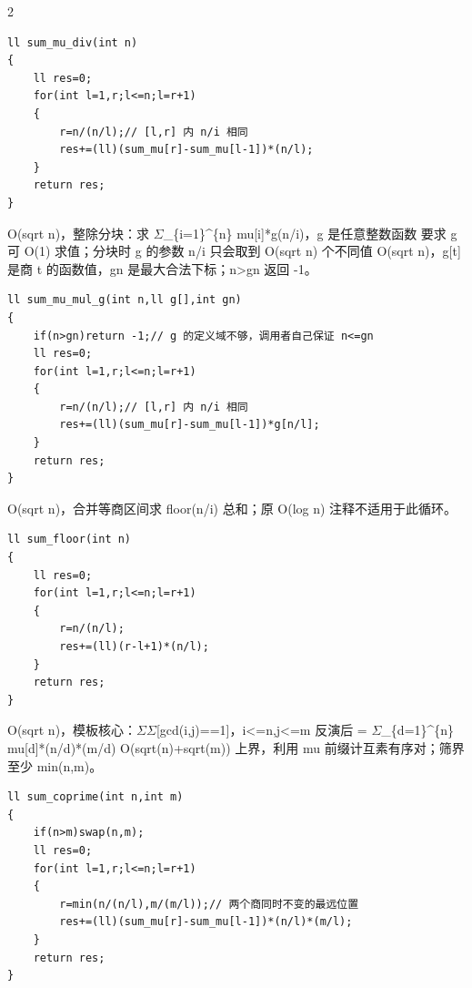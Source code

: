 \documentclass[UTF8,fontset=fandol,a4paper,twoside]{ctexart}
\newcommand{\note}[1]{{\fontsize{10}{12}\selectfont #1\par}}
\begin{document}
\begin{multicols}{2}
\begin{lstlisting}
ll sum_mu_div(int n)
{
    ll res=0;
    for(int l=1,r;l<=n;l=r+1)
    {
        r=n/(n/l);// [l,r] 内 n/i 相同
        res+=(ll)(sum_mu[r]-sum_mu[l-1])*(n/l);
    }
    return res;
}
\end{lstlisting}
\note{O(\allowbreak{}sqrt n)\allowbreak{}，整除分块：求 \ensuremath{\Sigma}\_\{i=\allowbreak{}1\}\textasciicircum{}\{n\} mu[\allowbreak{}i]\allowbreak{}*g(\allowbreak{}n/\allowbreak{}i)\allowbreak{}，g 是任意整数函数 要求 g 可 O(\allowbreak{}1)\allowbreak{} 求值；分块时 g 的参数 n/\allowbreak{}i 只会取到 O(\allowbreak{}sqrt n)\allowbreak{} 个不同值 O(\allowbreak{}sqrt n)\allowbreak{}，g[\allowbreak{}t]\allowbreak{} 是商 t 的函数值，gn 是最大合法下标；n>\allowbreak{}gn 返回 -\allowbreak{}1。}
\begin{lstlisting}
ll sum_mu_mul_g(int n,ll g[],int gn)
{
    if(n>gn)return -1;// g 的定义域不够，调用者自己保证 n<=gn
    ll res=0;
    for(int l=1,r;l<=n;l=r+1)
    {
        r=n/(n/l);// [l,r] 内 n/i 相同
        res+=(ll)(sum_mu[r]-sum_mu[l-1])*g[n/l];
    }
    return res;
}
\end{lstlisting}
\note{O(\allowbreak{}sqrt n)\allowbreak{}，合并等商区间求 floor(\allowbreak{}n/\allowbreak{}i)\allowbreak{} 总和；原 O(\allowbreak{}log n)\allowbreak{} 注释不适用于此循环。}
\begin{lstlisting}
ll sum_floor(int n)
{
    ll res=0;
    for(int l=1,r;l<=n;l=r+1)
    {
        r=n/(n/l);
        res+=(ll)(r-l+1)*(n/l);
    }
    return res;
}
\end{lstlisting}
\note{O(\allowbreak{}sqrt n)\allowbreak{}，模板核心：\ensuremath{\Sigma}\ensuremath{\Sigma}[\allowbreak{}gcd(\allowbreak{}i,\allowbreak{}j)\allowbreak{}=\allowbreak{}=\allowbreak{}1]\allowbreak{}，i<\allowbreak{}=\allowbreak{}n,\allowbreak{}j<\allowbreak{}=\allowbreak{}m 反演后 =\allowbreak{} \ensuremath{\Sigma}\_\{d=\allowbreak{}1\}\textasciicircum{}\{n\} mu[\allowbreak{}d]\allowbreak{}*(\allowbreak{}n/\allowbreak{}d)\allowbreak{}*(\allowbreak{}m/\allowbreak{}d)\allowbreak{} O(\allowbreak{}sqrt(\allowbreak{}n)\allowbreak{}+\allowbreak{}sqrt(\allowbreak{}m)\allowbreak{})\allowbreak{} 上界，利用 mu 前缀计互素有序对；筛界至少 min(\allowbreak{}n,\allowbreak{}m)\allowbreak{}。}
\begin{lstlisting}
ll sum_coprime(int n,int m)
{
    if(n>m)swap(n,m);
    ll res=0;
    for(int l=1,r;l<=n;l=r+1)
    {
        r=min(n/(n/l),m/(m/l));// 两个商同时不变的最远位置
        res+=(ll)(sum_mu[r]-sum_mu[l-1])*(n/l)*(m/l);
    }
    return res;
}
\end{lstlisting}

\end{multicols}
\end{document}
